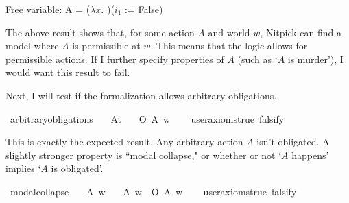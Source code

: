 \begin{isabellebody}
{  Free variable:
    A = ($\lambda x. \_$)($i_1$ := False)\color{black}%
}%
\endisatagproof
{\isafoldproof}%
%
\isadelimproof
%
\endisadelimproof
%
\begin{isamarkuptext}%
The above result shows that, for some action $A$ and world $w$, Nitpick can find a model where $A$
        is permissible at $w$. This means that the logic allows for permissible actions. If I further specify 
        properties of $A$ (such as `$A$ is murder'), I would want this result to fail.%
\end{isamarkuptext}\isamarkuptrue%
%
\begin{isamarkuptext}%
Next, I will test if the formalization allows arbitrary obligations.%
\end{isamarkuptext}\isamarkuptrue%
\isamarkupfalse%
\ arbitrary{\isacharunderscore}obligations{\isacharcolon}\isanewline
\ \ \ A{\isacharcolon}{\isacharcolon}{\isachardoublequoteopen}t{\isachardoublequoteclose}\isanewline
\ \ \ {\isachardoublequoteopen}O\ {\isacharbraceleft}A{\isacharbraceright}\ w{\isachardoublequoteclose}\isanewline
\ \ \isamarkupfalse%
\ {\isacharbrackleft}user{\isacharunderscore}axioms{\isacharequal}true{\isacharcomma}\ falsify{\isacharbrackright}%
\isadelimproof
\ %
\endisadelimproof
%
\isatagproof
{}\isamarkupfalse%
\isanewline
%
%
\endisatagproof
{\isafoldproof}%
%
\isadelimproof
%
\endisadelimproof
%
\begin{isamarkuptext}%
This is exactly the expected result. Any arbitrary action $A$ isn't obligated. A slightly 
        stronger property is ``modal collapse," or whether or not `$A$ happens' implies `$A$ is obligated'.%
\end{isamarkuptext}\isamarkuptrue%
\isamarkupfalse%
\ modal{\isacharunderscore}collapse{\isacharcolon}\isanewline
\ \ \ A\ w\isanewline
\ \ \ {\isachardoublequoteopen}A\ w\ {\isasymlongrightarrow}\ O\ {\isacharbraceleft}A{\isacharbraceright}\ w{\isachardoublequoteclose}\isanewline
\ \ \isamarkupfalse%
\ {\isacharbrackleft}user{\isacharunderscore}axioms{\isacharequal}true{\isacharcomma}\ falsify{\isacharbrackright}%
\isadelimproof
\ %
\endisadelimproof
%
\isatagproof
{}\isamarkupfalse%
\isanewline
%
\end{isabellebody}
